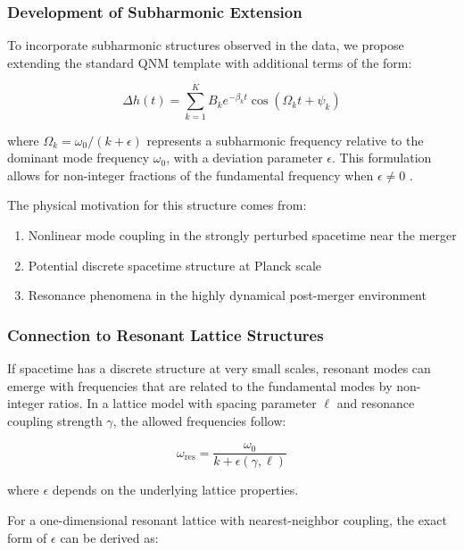 \documentclass[a4paper,12pt]{article}
\begin{document}
\subsubsection{Development of Subharmonic Extension}

To incorporate subharmonic structures observed in the data, we propose extending the standard QNM template with additional terms of the form:

\begin{equation}
\Delta h(t) = \sum_{k=1}^{K} B_k e^{-\beta_k t} \cos(\Omega_k t + \psi_k)
\end{equation}

where $\Omega_k = \omega_0 / (k + \epsilon)$ represents a subharmonic frequency relative to the dominant mode frequency $\omega_0$, with a deviation parameter $\epsilon$. This formulation allows for non-integer fractions of the fundamental frequency when $\epsilon \neq 0$ \cite{london2018modeling}.

The physical motivation for this structure comes from:

\begin{enumerate}
    \item Nonlinear mode coupling in the strongly perturbed spacetime near the merger \cite{giesler2019black}
    \item Potential discrete spacetime structure at Planck scale
    \item Resonance phenomena in the highly dynamical post-merger environment \cite{buonanno2007matching}
\end{enumerate}

\subsubsection{Connection to Resonant Lattice Structures}

If spacetime has a discrete structure at very small scales, resonant modes can emerge with frequencies that are related to the fundamental modes by non-integer ratios. In a lattice model with spacing parameter $\ell$ and resonance coupling strength $\gamma$, the allowed frequencies follow:

\begin{equation}
\omega_\textrm{res} = \frac{\omega_0}{k + \epsilon(\gamma, \ell)}
\end{equation}

where $\epsilon$ depends on the underlying lattice properties.

For a one-dimensional resonant lattice with nearest-neighbor coupling, the exact form of $\epsilon$ can be derived as:
\end{document}

